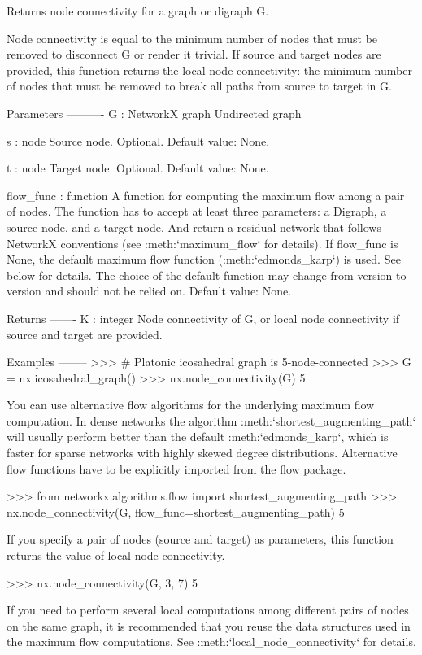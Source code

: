 \begin{DoxyVerb}Returns node connectivity for a graph or digraph G.

Node connectivity is equal to the minimum number of nodes that
must be removed to disconnect G or render it trivial. If source
and target nodes are provided, this function returns the local node
connectivity: the minimum number of nodes that must be removed to break
all paths from source to target in G.

Parameters
----------
G : NetworkX graph
    Undirected graph

s : node
    Source node. Optional. Default value: None.

t : node
    Target node. Optional. Default value: None.

flow_func : function
    A function for computing the maximum flow among a pair of nodes.
    The function has to accept at least three parameters: a Digraph,
    a source node, and a target node. And return a residual network
    that follows NetworkX conventions (see :meth:`maximum_flow` for
    details). If flow_func is None, the default maximum flow function
    (:meth:`edmonds_karp`) is used. See below for details. The
    choice of the default function may change from version
    to version and should not be relied on. Default value: None.

Returns
-------
K : integer
    Node connectivity of G, or local node connectivity if source
    and target are provided.

Examples
--------
>>> # Platonic icosahedral graph is 5-node-connected
>>> G = nx.icosahedral_graph()
>>> nx.node_connectivity(G)
5

You can use alternative flow algorithms for the underlying maximum
flow computation. In dense networks the algorithm
:meth:`shortest_augmenting_path` will usually perform better
than the default :meth:`edmonds_karp`, which is faster for
sparse networks with highly skewed degree distributions. Alternative
flow functions have to be explicitly imported from the flow package.

>>> from networkx.algorithms.flow import shortest_augmenting_path
>>> nx.node_connectivity(G, flow_func=shortest_augmenting_path)
5

If you specify a pair of nodes (source and target) as parameters,
this function returns the value of local node connectivity.

>>> nx.node_connectivity(G, 3, 7)
5

If you need to perform several local computations among different
pairs of nodes on the same graph, it is recommended that you reuse
the data structures used in the maximum flow computations. See
:meth:`local_node_connectivity` for details.


\end{DoxyVerb}
